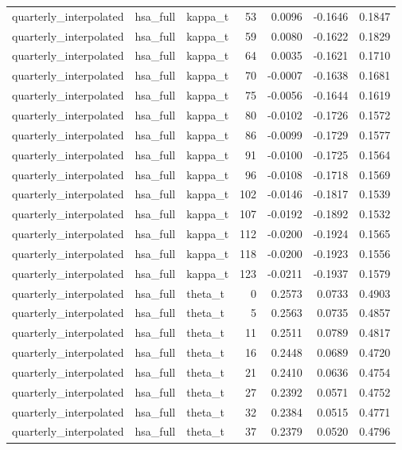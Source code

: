 \begin{tabular}{lllrrrr}
quarterly\_interpolated & hsa\_full & kappa\_t & 53 & 0.0096 & -0.1646 & 0.1847 \\
quarterly\_interpolated & hsa\_full & kappa\_t & 59 & 0.0080 & -0.1622 & 0.1829 \\
quarterly\_interpolated & hsa\_full & kappa\_t & 64 & 0.0035 & -0.1621 & 0.1710 \\
quarterly\_interpolated & hsa\_full & kappa\_t & 70 & -0.0007 & -0.1638 & 0.1681 \\
quarterly\_interpolated & hsa\_full & kappa\_t & 75 & -0.0056 & -0.1644 & 0.1619 \\
quarterly\_interpolated & hsa\_full & kappa\_t & 80 & -0.0102 & -0.1726 & 0.1572 \\
quarterly\_interpolated & hsa\_full & kappa\_t & 86 & -0.0099 & -0.1729 & 0.1577 \\
quarterly\_interpolated & hsa\_full & kappa\_t & 91 & -0.0100 & -0.1725 & 0.1564 \\
quarterly\_interpolated & hsa\_full & kappa\_t & 96 & -0.0108 & -0.1718 & 0.1569 \\
quarterly\_interpolated & hsa\_full & kappa\_t & 102 & -0.0146 & -0.1817 & 0.1539 \\
quarterly\_interpolated & hsa\_full & kappa\_t & 107 & -0.0192 & -0.1892 & 0.1532 \\
quarterly\_interpolated & hsa\_full & kappa\_t & 112 & -0.0200 & -0.1924 & 0.1565 \\
quarterly\_interpolated & hsa\_full & kappa\_t & 118 & -0.0200 & -0.1923 & 0.1556 \\
quarterly\_interpolated & hsa\_full & kappa\_t & 123 & -0.0211 & -0.1937 & 0.1579 \\
quarterly\_interpolated & hsa\_full & theta\_t & 0 & 0.2573 & 0.0733 & 0.4903 \\
quarterly\_interpolated & hsa\_full & theta\_t & 5 & 0.2563 & 0.0735 & 0.4857 \\
quarterly\_interpolated & hsa\_full & theta\_t & 11 & 0.2511 & 0.0789 & 0.4817 \\
quarterly\_interpolated & hsa\_full & theta\_t & 16 & 0.2448 & 0.0689 & 0.4720 \\
quarterly\_interpolated & hsa\_full & theta\_t & 21 & 0.2410 & 0.0636 & 0.4754 \\
quarterly\_interpolated & hsa\_full & theta\_t & 27 & 0.2392 & 0.0571 & 0.4752 \\
quarterly\_interpolated & hsa\_full & theta\_t & 32 & 0.2384 & 0.0515 & 0.4771 \\
quarterly\_interpolated & hsa\_full & theta\_t & 37 & 0.2379 & 0.0520 & 0.4796 \\

\end{tabular}
